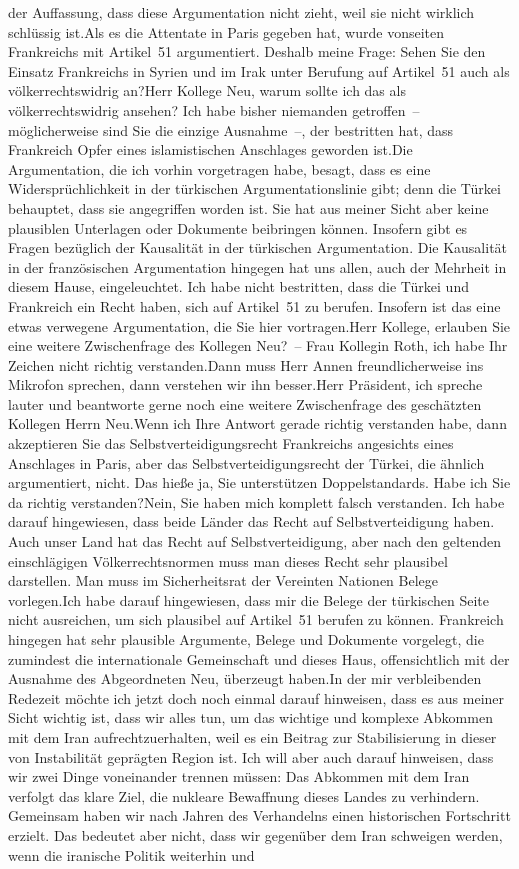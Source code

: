 \documentclass{article}
\begin{document}
der Auffassung, dass diese Argumentation nicht zieht, weil sie nicht wirklich schlüssig ist.Als es die Attentate in Paris gegeben hat, wurde vonseiten Frankreichs mit Artikel 51 argumentiert. Deshalb meine Frage: Sehen Sie den Einsatz Frankreichs in Syrien und im Irak unter Berufung auf Artikel 51 auch als völkerrechtswidrig an?Herr Kollege Neu, warum sollte ich das als völkerrechtswidrig ansehen? Ich habe bisher niemanden getroffen – möglicherweise sind Sie die einzige Ausnahme –, der bestritten hat, dass Frankreich Opfer eines islamistischen Anschlages geworden ist.Die Argumentation, die ich vorhin vorgetragen habe, besagt, dass es eine Widersprüchlichkeit in der türkischen Argumentationslinie gibt; denn die Türkei behauptet, dass sie angegriffen worden ist. Sie hat aus meiner Sicht aber keine plausiblen Unterlagen oder Dokumente beibringen können. Insofern gibt es Fragen bezüglich der Kausalität in der türkischen Argumentation. Die Kausalität in der französischen Argumentation hingegen hat uns allen, auch der Mehrheit in diesem Hause, eingeleuchtet. Ich habe nicht bestritten, dass die Türkei und Frankreich ein Recht haben, sich auf Artikel 51 zu berufen. Insofern ist das eine etwas verwegene Argumentation, die Sie hier vortragen.Herr Kollege, erlauben Sie eine weitere Zwischenfrage des Kollegen Neu? – Frau Kollegin Roth, ich habe Ihr Zeichen nicht richtig verstanden.Dann muss Herr Annen freundlicherweise ins Mikrofon sprechen, dann verstehen wir ihn besser.Herr Präsident, ich spreche lauter und beantworte gerne noch eine weitere Zwischenfrage des geschätzten Kollegen Herrn Neu.Wenn ich Ihre Antwort gerade richtig verstanden habe, dann akzeptieren Sie das Selbstverteidigungsrecht Frankreichs angesichts eines Anschlages in Paris, aber das Selbstverteidigungsrecht der Türkei, die ähnlich argumentiert, nicht. Das hieße ja, Sie unterstützen Doppelstandards. Habe ich Sie da richtig verstanden?Nein, Sie haben mich komplett falsch verstanden. Ich habe darauf hingewiesen, dass beide Länder das Recht auf Selbstverteidigung haben. Auch unser Land hat das Recht auf Selbstverteidigung, aber nach den geltenden einschlägigen Völkerrechtsnormen muss man dieses Recht sehr plausibel darstellen. Man muss im Sicherheitsrat der Vereinten Nationen Belege vorlegen.Ich habe darauf hingewiesen, dass mir die Belege der türkischen Seite nicht ausreichen, um sich plausibel auf Artikel 51 berufen zu können. Frankreich hingegen hat sehr plausible Argumente, Belege und Dokumente vorgelegt, die zumindest die internationale Gemeinschaft und dieses Haus, offensichtlich mit der Ausnahme des Abgeordneten Neu, überzeugt haben.In der mir verbleibenden Redezeit möchte ich jetzt doch noch einmal darauf hinweisen, dass es aus meiner Sicht wichtig ist, dass wir alles tun, um das wichtige und komplexe Abkommen mit dem Iran aufrechtzuerhalten, weil es ein Beitrag zur Stabilisierung in dieser von Instabilität geprägten Region ist. Ich will aber auch darauf hinweisen, dass wir zwei Dinge voneinander trennen müssen: Das Abkommen mit dem Iran verfolgt das klare Ziel, die nukleare Bewaffnung dieses Landes zu verhindern. Gemeinsam haben wir nach Jahren des Verhandelns einen historischen Fortschritt erzielt. Das bedeutet aber nicht, dass wir gegenüber dem Iran schweigen werden, wenn die iranische Politik weiterhin und 
\end{document}
